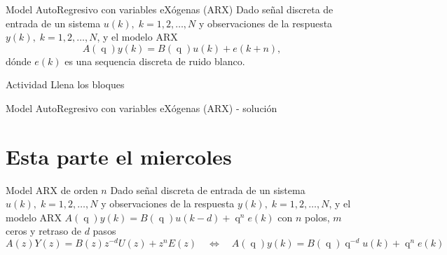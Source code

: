 \documentclass[presentation,aspectratio=169]{beamer}
\DeclareMathOperator{\shift}{q}
\begin{document}
\begin{frame}[label={sec:org9b98dfb}]{Model AutoRegresivo con variables eXógenas (ARX)}
Dado señal discreta de entrada de un sistema \(u(k), \; k=1,2,\ldots, N\) y observaciones de la respuesta \(y(k), \; k=1,2,\ldots,N\), y el modelo ARX
\[ A(\shift) y(k) = B(\shift)u(k) + e(k+n),\]
dónde \(e(k)\) es una sequencia discreta de ruido blanco.

\alert{Actividad} Llena los bloques

\begin{center}
\end{center}
\end{frame}


\begin{frame}[label={sec:orgb42fa79}]{Model AutoRegresivo con variables eXógenas (ARX) - solución}
\end{frame}



\section{Esta parte el miercoles}
\label{sec:org938d752}
\begin{frame}[label={sec:org0b1bb45}]{Model ARX de orden \(n\)}
Dado señal discreta de entrada de un sistema \(u(k), \; k=1,2,\ldots, N\) y observaciones de la respuesta \(y(k), \; k=1,2,\ldots,N\), y el modelo ARX \(A(\shift)y(k) = B(\shift)u(k-d) + \shift^n e(k)\) con \(n\) polos, \(m\) ceros y retraso de \(d\) pasos
\[A(z)Y(z) = B(z)z^{-d}U(z) + z^nE(z) \quad \Leftrightarrow \quad A(\shift)y(k) = B(\shift)\shift^{-d}u(k) + \shift^{n} e(k)\]
\end{frame}
\end{document}
